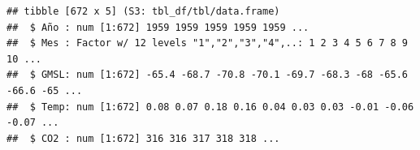 \documentclass[12pt,a4paper,]{book}
\newenvironment{Shaded}{\begin{snugshade}}{\end{snugshade}}
\newcommand{\DecValTok}[1]{\textcolor[rgb]{0.00,0.00,0.81}{#1}}
\newcommand{\FunctionTok}[1]{\textcolor[rgb]{0.13,0.29,0.53}{\textbf{#1}}}
\newcommand{\NormalTok}[1]{#1}
\newcommand{\OtherTok}[1]{\textcolor[rgb]{0.56,0.35,0.01}{#1}}
\newcommand{\SpecialCharTok}[1]{\textcolor[rgb]{0.81,0.36,0.00}{\textbf{#1}}}
\newcommand{\StringTok}[1]{\textcolor[rgb]{0.31,0.60,0.02}{#1}}
\numberwithin{dummy}{section}
\theoremstyle{ocrenumbox}
\theoremstyle{blacknumex}
\theoremstyle{blacknumbox}
\theoremstyle{ocrenum}
\theoremstyle{ocrenum}
\begin{document}
\begin{Shaded}
\end{Shaded}

\begin{verbatim}
## tibble [672 x 5] (S3: tbl_df/tbl/data.frame)
##  $ Año : num [1:672] 1959 1959 1959 1959 1959 ...
##  $ Mes : Factor w/ 12 levels "1","2","3","4",..: 1 2 3 4 5 6 7 8 9 10 ...
##  $ GMSL: num [1:672] -65.4 -68.7 -70.8 -70.1 -69.7 -68.3 -68 -65.6 -66.6 -65 ...
##  $ Temp: num [1:672] 0.08 0.07 0.18 0.16 0.04 0.03 0.03 -0.01 -0.06 -0.07 ...
##  $ CO2 : num [1:672] 316 316 317 318 318 ...
\end{verbatim}
\end{document}
